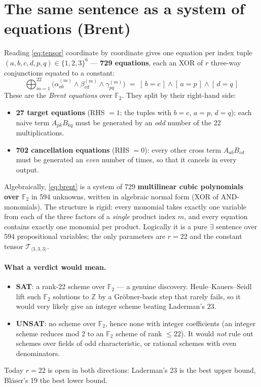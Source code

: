 \documentclass[10pt]{article}
\newcommand{\F}{\mathbb F_2}
\newcommand{\T}{\mathcal T_{\langle 3,3,3\rangle}}
\newcommand{\iv}[1]{[\,#1\,]}
\newcommand{\al}[1]{\alpha^{(#1)}}
\newcommand{\be}[1]{\beta^{(#1)}}
\newcommand{\ga}[1]{\gamma^{(#1)}}
\begin{document}
\section{The same sentence as a system of equations (Brent)}

Reading \eqref{eq:tensor} coordinate by coordinate gives one equation
per index tuple $(a,b,c,d,p,q)\in\{1,2,3\}^6$ --- \textbf{729 equations},
each an XOR of $r$ three-way conjunctions equated to a constant:
\begin{equation}\label{eq:brent}
  \boxed{\;
  \bigoplus_{m=1}^{22}\Big(\al{m}_{ab}\wedge\be{m}_{cd}\wedge\ga{m}_{pq}\Big)
  \;=\; \iv{b=c}\wedge\iv{a=p}\wedge\iv{d=q}
  \;}
\end{equation}
These are the \emph{Brent equations} over $\F$. They split by their
right-hand side:
\begin{itemize}
\item \textbf{27 target equations} (RHS $=1$; the tuples with $b=c$,
  $a=p$, $d=q$): each naive term $A_{pk}B_{kq}$ must be generated by an
  \emph{odd} number of the 22 multiplications.
\item \textbf{702 cancellation equations} (RHS $=0$): every other cross
  term $A_{ab}B_{cd}$ must be generated an \emph{even} number of times,
  so that it cancels in every output.
\end{itemize}

Algebraically, \eqref{eq:brent} is a system of 729
\textbf{multilinear cubic polynomials over $\F$} in 594 unknowns, written
in algebraic normal form (XOR of AND-monomials). The structure is rigid:
every monomial takes exactly one variable from each of the three factors
of a \emph{single} product index $m$, and every equation contains exactly
one monomial per product. Logically it is a pure $\exists$ sentence over
594 propositional variables; the only parameters are $r=22$ and the
constant tensor $\T$.

\paragraph{What a verdict would mean.}
\begin{itemize}
\item \textbf{SAT}: a rank-22 scheme over $\F$ --- a genuine discovery.
  Heule--Kauers--Seidl lift such $\F$ solutions to $\mathbb Z$ by a
  Gr\"obner-basis step that rarely fails, so it would very likely give
  an integer scheme beating Laderman's 23.
\item \textbf{UNSAT}: no scheme over $\F$, hence none with integer
  coefficients (an integer scheme reduces mod 2 to an $\F$ scheme of
  rank $\le 22$). It would \emph{not} rule out schemes over fields of
  odd characteristic, or rational schemes with even denominators.
\end{itemize}
Today $r=22$ is open in both directions: Laderman's 23 is the best
upper bound, Bl\"aser's 19 the best lower bound.
\end{document}
